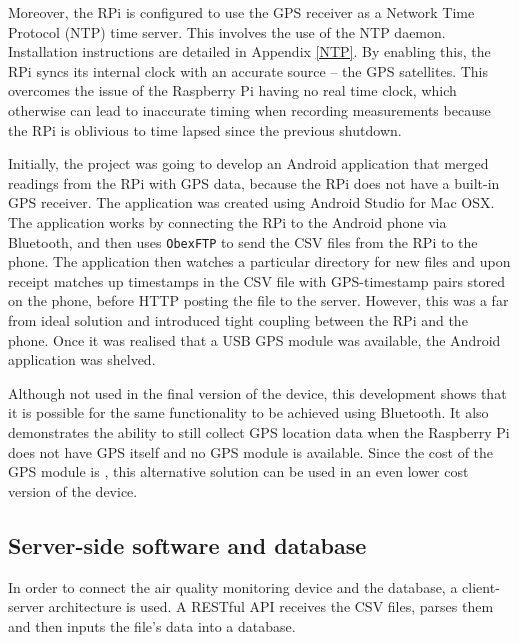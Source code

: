 \documentclass[11pt,twosided,a4paper]{report}
\begin{document}
Moreover, the RPi is configured to use the GPS receiver as a Network Time Protocol (NTP) time server. This involves the use of the NTP daemon. Installation instructions are detailed in Appendix \ref{NTP}. By enabling this, the RPi syncs its internal clock with an accurate source -- the GPS satellites. This overcomes the issue of the Raspberry Pi having no real time clock, which otherwise can lead to inaccurate timing when recording measurements because the RPi is oblivious to time lapsed since the previous shutdown.

Initially, the project was going to develop an Android application that merged readings from the RPi with GPS data, because the RPi does not have a built-in GPS receiver. The application was created using Android Studio for Mac OSX. The application works by connecting the RPi to the Android phone via Bluetooth, and then uses \texttt{ObexFTP} to send the CSV files from the RPi to the phone. The application then watches a particular directory for new files and upon receipt matches up timestamps in the CSV file with GPS-timestamp pairs stored on the phone, before HTTP posting the file to the server. However, this was a far from ideal solution and introduced tight coupling between the RPi and the phone. Once it was realised that a USB GPS module was available, the Android application was shelved.


Although not used in the final version of the device, this development shows that it is possible for the same functionality to be achieved using Bluetooth. It also demonstrates the ability to still collect GPS location data when the Raspberry Pi does not have GPS itself and no GPS module is available. Since the cost of the GPS module is , this alternative solution can be used in an even lower cost version of the device.



\subsection{Server-side software and database} \label{server_software}

In order to connect the air quality monitoring device and the database, a client-server architecture is used. A RESTful API receives the CSV files, parses them and then inputs the file's data into a database.
\end{document}
